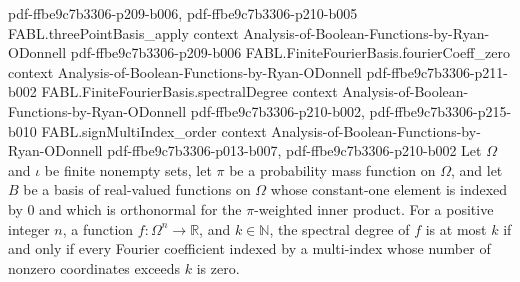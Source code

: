 \begin{theorem}
  {pdf-ffbe9c7b3306-p209-b006,
    pdf-ffbe9c7b3306-p210-b005}
\proofstep
  {FABL.threePointBasis_apply}
  {context}
  {Analysis-of-Boolean-Functions-by-Ryan-ODonnell}
  {pdf-ffbe9c7b3306-p209-b006}
\proofstep
  {FABL.FiniteFourierBasis.fourierCoeff_zero}
  {context}
  {Analysis-of-Boolean-Functions-by-Ryan-ODonnell}
  {pdf-ffbe9c7b3306-p211-b002}
\proofstep
  {FABL.FiniteFourierBasis.spectralDegree}
  {context}
  {Analysis-of-Boolean-Functions-by-Ryan-ODonnell}
  {pdf-ffbe9c7b3306-p210-b002,
    pdf-ffbe9c7b3306-p215-b010}
\proofstep
  {FABL.signMultiIndex_order}
  {context}
  {Analysis-of-Boolean-Functions-by-Ryan-ODonnell}
  {pdf-ffbe9c7b3306-p013-b007,
    pdf-ffbe9c7b3306-p210-b002}
Let $\Omega$ and $\iota$ be finite nonempty sets, let $\pi$ be a probability mass
function on $\Omega$, and let $B$ be a basis of real-valued functions on $\Omega$ whose
constant-one element is indexed by $0$ and which is orthonormal for the $\pi$-weighted
inner product. For a positive integer $n$, a function $f:\Omega^n\to\mathbb R$, and
$k\in\mathbb N$, the spectral degree of $f$ is at most $k$ if and only if every Fourier
coefficient indexed by a multi-index whose number of nonzero coordinates exceeds $k$ is
zero.
\end{theorem}

